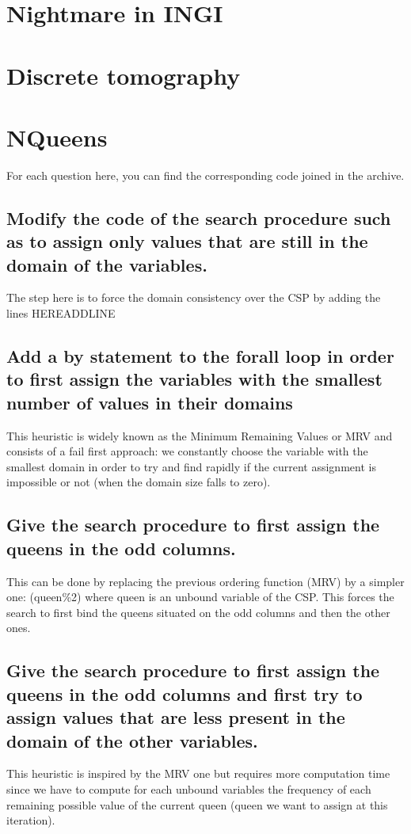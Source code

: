 \documentclass[a4paper ,12pt,french]{article}
\begin{document}
\tableofcontents %

\thispagestyle{fancy}

\pagebreak
\setcounter{page}{1}
\pagestyle{fancy} %

\section{Nightmare in INGI}
\section{Discrete tomography}
\section{NQueens}
For each question here, you can find the corresponding code joined in the archive. 
\subsection{Modify the code of the search procedure such as to assign only values that are still in the domain of the variables.}
The step here is to force the domain consistency over the CSP by adding the lines HEREADDLINE
\subsection{Add a by statement to the forall loop in order to first assign the variables with the smallest number of values in their domains}
This heuristic is widely known as the Minimum Remaining Values or MRV and consists of a fail first approach: we constantly choose the variable with the smallest domain in order to try and find rapidly if the current assignment is impossible or not (when the domain size falls to zero). 
\subsection{Give the search procedure to first assign the queens in the odd columns.}
This can be done by replacing the previous ordering function (MRV) by a simpler one: (queen\%2) where queen is an unbound variable of the CSP. This forces the search to first bind the queens situated on the odd columns and then the other ones. 
\subsection{Give the search procedure to first assign the queens in the odd columns and first try to assign values that are less present in the domain of the other variables.}
This heuristic is inspired by the MRV one but requires more computation time since we have to compute for each unbound variables the frequency of each remaining possible value of the current queen (queen we want to assign at this iteration).
\end{document}
